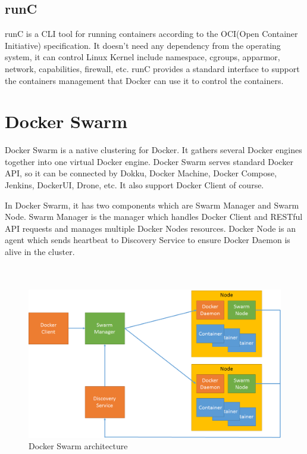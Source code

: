 \subsection{runC}
runC is a CLI tool for running containers according to the OCI(Open Container Initiative) specification. It doesn't need any dependency from the operating system, it can control Linux Kernel include namespace, cgroups, apparmor, network, capabilities, firewall, etc.
runC provides a standard interface to support the containers management that Docker can use it to control the containers.

\section{Docker Swarm}
Docker Swarm \cite{DockerSwarm} is a native clustering for Docker. It gathers several Docker engines together into one virtual Docker engine. Docker Swarm serves standard Docker API, so it can be connected by Dokku, Docker Machine, Docker Compose, Jenkins, DockerUI, Drone, etc. It also support Docker Client of course.

In Docker Swarm, it has two components which are Swarm Manager and Swarm Node. Swarm Manager is the manager which handles Docker Client and RESTful API requests and manages multiple Docker Nodes resources. Docker Node is an agent which sends heartbeat to Discovery Service to ensure Docker Daemon is alive in the cluster.
\\
\\
\\
\begin{figure}[h]
\begin{center}
\includegraphics[width=15cm]{figure/swarm_docker.png}
\end{center}
\caption{Docker Swarm architecture}
\end{figure}

